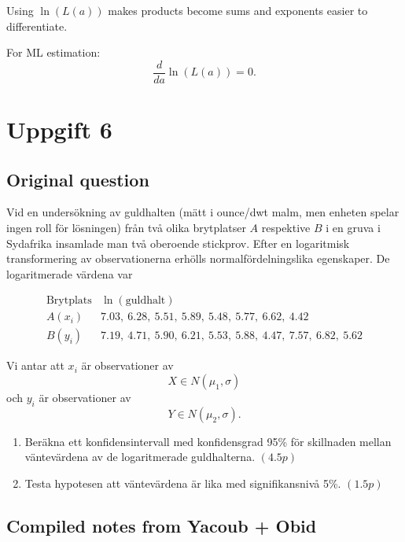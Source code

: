 \documentclass[10pt]{article}
\begin{document}
Using \(\ln(L(a))\) makes products become sums and
exponents easier to differentiate.

For ML estimation:
\[
\frac{d}{da}\ln(L(a))=0.
\]

\section*{Uppgift 6}

\subsection*{Original question}

Vid en undersökning av guldhalten (mätt i
ounce/dwt malm, men enheten spelar ingen roll för
lösningen) från två olika brytplatser \(A\)
respektive \(B\) i en gruva i Sydafrika insamlade
man två oberoende stickprov. Efter en logaritmisk
transformering av observationerna erhölls
normalfördelningslika egenskaper. De logaritmerade
värdena var

\[
\begin{array}{c|c}
\text{Brytplats} & \ln(\text{guldhalt})\\
\hline
A(x_i) &
7.03,\ 6.28,\ 5.51,\ 5.89,\ 5.48,\ 5.77,\ 6.62,\ 4.42\\
B(y_i) &
7.19,\ 4.71,\ 5.90,\ 6.21,\ 5.53,\ 5.88,\ 4.47,\ 7.57,\ 6.82,\ 5.62
\end{array}
\]

Vi antar att \(x_i\) är observationer av
\[
X\in N(\mu_1,\sigma)
\]
och \(y_i\) är observationer av
\[
Y\in N(\mu_2,\sigma).
\]

\begin{enumerate}[label=\alph*)]
\item Beräkna ett konfidensintervall med
konfidensgrad 95\% för skillnaden mellan
väntevärdena av de logaritmerade guldhalterna.
\((4.5p)\)

\item Testa hypotesen att väntevärdena är lika med
signifikansnivå 5\%. \((1.5p)\)
\end{enumerate}

\subsection*{Compiled notes from Yacoub + Obid}
\end{document}
